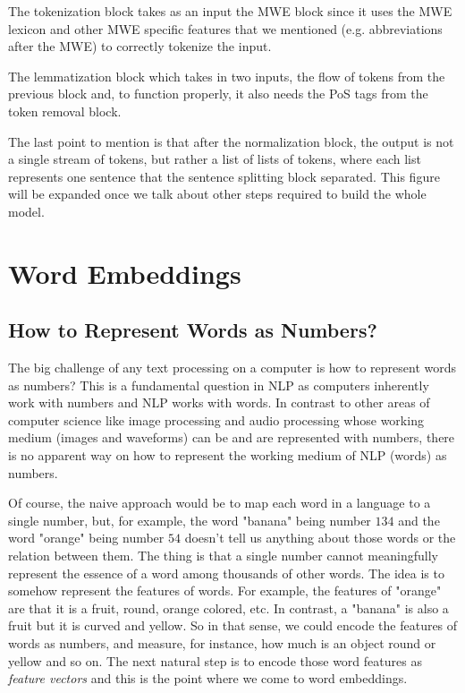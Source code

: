 \documentclass[12pt]{article}
\numberwithin{equation}{section}
\begin{document}
\begin{spacing}{1.5}
	The tokenization block takes as an input the MWE block since it uses the MWE lexicon and other MWE specific features that we mentioned (e.g. abbreviations after the MWE) to correctly tokenize the input.
	
	The lemmatization block which takes in two inputs, the flow of tokens from the previous block and, to function properly, it also needs the PoS tags from the token removal block.
	
	The last point to mention is that after the normalization block, the output is not a single stream of tokens, but rather a list of lists of tokens, where each list represents one sentence that the sentence splitting block separated.
	This figure will be expanded once we talk about other steps required to build the whole model. 

	
	\newpage 
	\section{Word Embeddings}
	\subsection{How to Represent Words as Numbers?}
	The big challenge of any text processing on a computer is how to represent words as numbers? This is a fundamental question in NLP as computers inherently work with numbers and NLP works with words. In contrast to other areas of computer science like image processing and audio processing whose working medium (images and waveforms) can be and are represented with numbers, there is no apparent way on how to represent the working medium of NLP (words) as numbers.
	
	Of course, the naive approach would be to map each word in a language to a single number, but, for example, the word "banana" being number $134$ and the word "orange" being number $54$ doesn't tell us anything about those words or the relation between them. The thing is that a single number cannot meaningfully represent the essence of a word among thousands of other words. The idea is to somehow represent the features of words. For example, the features of "orange" are that it is a fruit, round, orange colored, etc. In contrast, a "banana" is also a fruit but it is curved and yellow. So in that sense, we could encode the features of words as numbers, and measure, for instance, how much is an object round or yellow and so on. The next natural step is to encode those word features as \textit{feature vectors} and this is the point where we come to word embeddings.
	

\end{spacing}
\end{document}
